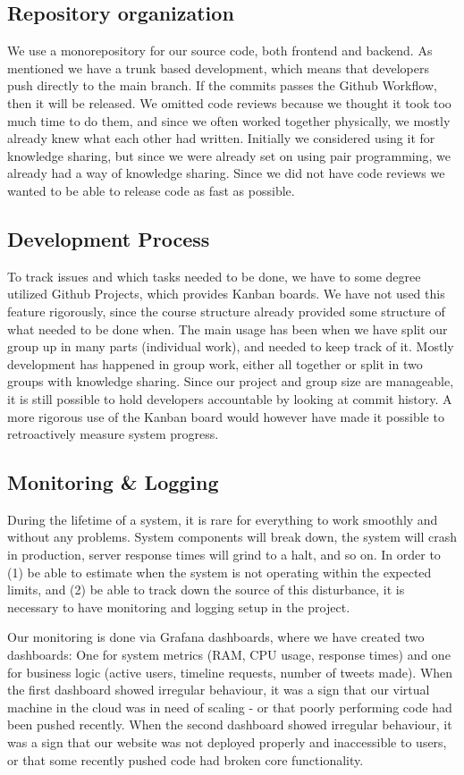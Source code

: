 \subsection{Repository organization}
We use a monorepository for our source code, both frontend and backend. As mentioned we have a trunk based development, which means that developers push directly to the main branch. If the commits passes the Github Workflow, then it will be released. We omitted code reviews because we thought it took too much time to do them, and since we often worked together physically, we mostly already knew what each other had written. Initially we considered using it for knowledge sharing, but since we were already set on using pair programming, we already had a way of knowledge sharing. Since we did not have code reviews we wanted to be able to release code as fast as possible.

\subsection{Development Process}
To track issues and which tasks needed to be done, we have to some degree utilized Github Projects, which provides Kanban boards. We have not used this feature rigorously, since the course structure already provided some structure of what needed to be done when. The main usage has been when we have split our group up in many parts (individual work), and needed to keep track of it. Mostly development has happened in group work, either all together or split in two groups with knowledge sharing. Since our project and group size are manageable, it is still possible to hold developers accountable by looking at commit history. A more rigorous use of the Kanban board would however have made it possible to retroactively measure system progress. 

\subsection{Monitoring \& Logging}
During the lifetime of a system, it is rare for everything to work smoothly and without any problems. System components will break down, the system will crash in production, server response times will grind to a halt, and so on. In order to (1) be able to estimate when the system is not operating within the expected limits, and (2) be able to track down the source of this disturbance, it is necessary to have monitoring and logging setup in the project.

Our monitoring is done via Grafana dashboards, where we have created two dashboards: One for system metrics (RAM, CPU usage, response times) and one for business logic (active users, timeline requests, number of tweets made). When the first dashboard showed irregular behaviour, it was a sign that our virtual machine in the cloud was in need of scaling - or that poorly performing code had been pushed recently. When the second dashboard showed irregular behaviour, it was a sign that our website was not deployed properly and inaccessible to users, or that some recently pushed code had broken core functionality.

